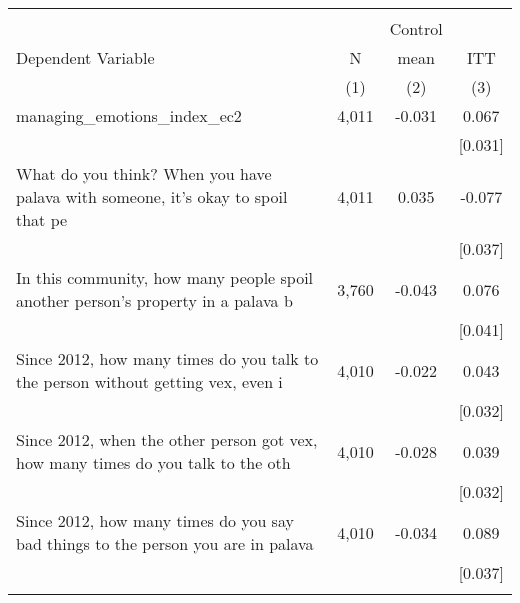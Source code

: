 \begin{tabular}{lccc}
\hline \noalign{\smallskip} &  &  & \\
 &  & Control & \\
Dependent Variable & N & mean & ITT\\
 & (1) & (2) & (3)\\
\noalign{\smallskip}\hline \noalign{\smallskip}managing_emotions_index_ec2 & 4,011 & -0.031 & 0.067\\
 &  &  & [0.031]\\
What do you think? When you have palava with someone, it's okay to spoil that pe & 4,011 & 0.035 & -0.077\\
 &  &  & [0.037]\\
In this community, how many people spoil another person's property in a palava b & 3,760 & -0.043 & 0.076\\
 &  &  & [0.041]\\
Since 2012, how many times do you talk to the person without getting vex, even i & 4,010 & -0.022 & 0.043\\
 &  &  & [0.032]\\
Since 2012, when the other person got vex, how many times do you talk to the oth & 4,010 & -0.028 & 0.039\\
 &  &  & [0.032]\\
Since 2012, how many times do you say bad things to the person you are in palava & 4,010 & -0.034 & 0.089\\
 &  &  & [0.037]\\
\noalign{\smallskip}\hline\end{tabular}
